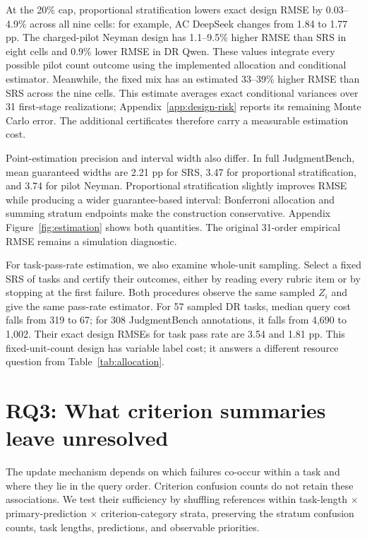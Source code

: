 \documentclass[10pt,letterpaper]{article}
\begin{document}
At the 20\% cap, proportional stratification lowers exact design RMSE by 0.03--4.9\% across all nine cells: for example, AC DeepSeek changes from 1.84 to 1.77 pp. The charged-pilot Neyman design has 1.1--9.5\% higher RMSE than SRS in eight cells and 0.9\% lower RMSE in DR Qwen. These values integrate every possible pilot count outcome using the implemented allocation and conditional estimator. Meanwhile, the fixed mix has an estimated 33--39\% higher RMSE than SRS across the nine cells. This estimate averages exact conditional variances over 31 first-stage realizations; Appendix~\ref{app:design-risk} reports its remaining Monte Carlo error. The additional certificates therefore carry a measurable estimation cost.

Point-estimation precision and interval width also differ. In full JudgmentBench, mean guaranteed widths are 2.21 pp for SRS, 3.47 for proportional stratification, and 3.74 for pilot Neyman. Proportional stratification slightly improves RMSE while producing a wider guarantee-based interval: Bonferroni allocation and summing stratum endpoints make the construction conservative. Appendix Figure~\ref{fig:estimation} shows both quantities. The original 31-order empirical RMSE remains a simulation diagnostic.

For task-pass-rate estimation, we also examine whole-unit sampling. Select a fixed SRS of tasks and certify their outcomes, either by reading every rubric item or by stopping at the first failure. Both procedures observe the same sampled $Z_i$ and give the same pass-rate estimator. For 57 sampled DR tasks, median query cost falls from 319 to 67; for 308 JudgmentBench annotations, it falls from 4,690 to 1,002. Their exact design RMSEs for task pass rate are 3.54 and 1.81 pp. This fixed-unit-count design has variable label cost; it answers a different resource question from Table~\ref{tab:allocation}.

\section{RQ3: What criterion summaries leave unresolved}\label{sec:rq3}
The update mechanism depends on which failures co-occur within a task and where they lie in the query order. Criterion confusion counts do not retain these associations. We test their sufficiency by shuffling references within task-length $\times$ primary-prediction $\times$ criterion-category strata, preserving the stratum confusion counts, task lengths, predictions, and observable priorities.
\end{document}
